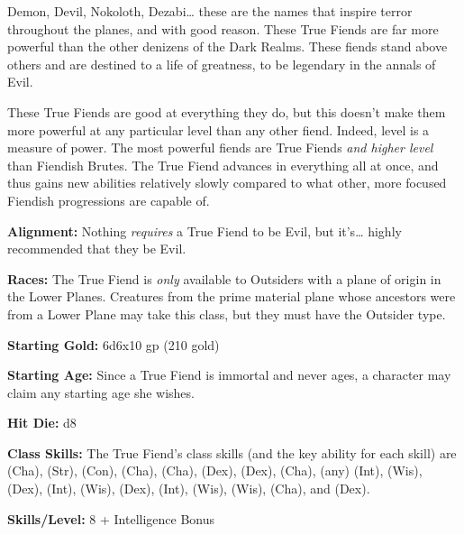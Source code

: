 
Demon, Devil, Nokoloth, Dezabi\ldots{} these are the names that inspire terror throughout the planes, and with good reason. These True Fiends are far more powerful than the other denizens of the Dark Realms. These fiends stand above others and are destined to a life of greatness, to be legendary in the annals of Evil.

These True Fiends are good at everything they do, but this doesn't make them more powerful at any particular level than any other fiend. Indeed, level is a measure of power. The most powerful fiends are True Fiends \textit{and higher level} than Fiendish Brutes. The True Fiend advances in everything all at once, and thus gains new abilities relatively slowly compared to what other, more focused Fiendish progressions are capable of.

\textbf{Alignment:} Nothing \textit{requires} a True Fiend to be Evil, but it's\ldots{} highly recommended that they be Evil.

\textbf{Races:} The True Fiend is \textit{only} available to Outsiders with a plane of origin in the Lower Planes. Creatures from the prime material plane whose ancestors were from a Lower Plane may take this class, but they must have the Outsider type.

\textbf{Starting Gold:} 6d6x10 gp (210 gold)

\textbf{Starting Age:} Since a True Fiend is immortal and never ages, a character may claim any starting age she wishes.

\textbf{Hit Die:} d8

\textbf{Class Skills:} The True Fiend's class skills (and the key ability for each skill) are  (Cha),  (Str),  (Con),  (Cha),  (Cha),  (Dex),  (Dex),  (Cha),  (any) (Int),  (Wis),  (Dex),  (Int),  (Wis),  (Dex),  (Int),  (Wis),  (Wis),  (Cha), and  (Dex).

\textbf{Skills/Level:} 8 + Intelligence Bonus

